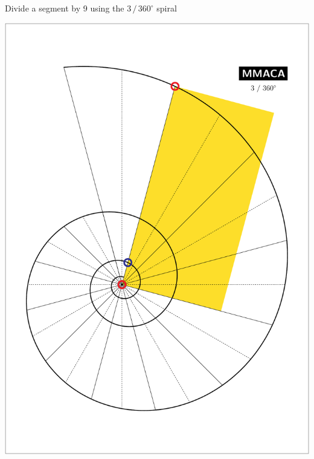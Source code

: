 \documentclass[a4paper,12pt]{article}
\begin{document}
    \begin{center}
    
        \large

        Divide a segment by 9 using the $3 \, / \, 360^{\circ}$ spiral

        \bigskip \bigskip \bigskip
    
        \includegraphics[scale=0.7071]{./pictures/Example_13}

    \end{center}

    \newpage

\end{document}
